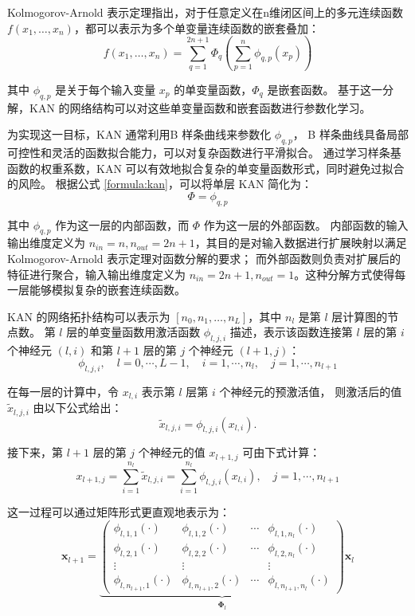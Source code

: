 Kolmogorov-Arnold 表示定理指出，对于任意定义在n维闭区间上的多元连续函数$f(x_1, \ldots, x_n)$，都可以表示为多个单变量连续函数的嵌套叠加：
\begin{equation}
    \label{formula:kan}
f(x_1, \ldots, x_n)=\sum_{q=1}^{2 n+1} \Phi_q(\sum_{p=1}^n \phi_{q, p}(x_p))
\end{equation}

其中 $\phi_{q, p}$ 是关于每个输入变量 $x_p$ 的单变量函数，$\Phi_q$ 是嵌套函数。
基于这一分解，KAN 的网络结构可以对这些单变量函数和嵌套函数进行参数化学习。

为实现这一目标，KAN 通常利用B 样条曲线来参数化 $\phi_{q, p}$，
B 样条曲线具备局部可控性和灵活的函数拟合能力，可以对复杂函数进行平滑拟合。
通过学习样条基函数的权重系数，KAN 可以有效地拟合复杂的单变量函数形式，同时避免过拟合的风险。
根据公式 \eqref{formula:kan}，可以将单层 KAN 简化为：
\begin{equation}
    \Phi = {\phi_{q,p}}
\end{equation}

其中 $\phi_{q,p}$ 作为这一层的内部函数，而 $\Phi$ 作为这一层的外部函数。
内部函数的输入输出维度定义为 $n_{in}=n, n_{out}=2n+1$，其目的是对输入数据进行扩展映射以满足 Kolmogorov-Arnold 表示定理对函数分解的要求；
而外部函数则负责对扩展后的特征进行聚合，输入输出维度定义为 $n_{in}=2n+1, n_{out}=1$。这种分解方式使得每一层能够模拟复杂的嵌套连续函数。

KAN 的网络拓扑结构可以表示为 $[n_0, n_1, …, n_L]$，其中 $n_l$ 是第 $l$ 层计算图的节点数。
第 $l$ 层的单变量函数用激活函数 $\phi_{l,j,i}$ 描述，表示该函数连接第 $l$ 层的第 $i$ 个神经元 $(l,i)$ 和第 $l+1$ 层的第 $j$ 个神经元 $(l+1,j)$：
\begin{equation}
    \phi_{l, j, i}, \quad l=0, \cdots, L-1, \quad i=1, \cdots, n_l, \quad j=1, \cdots, n_{l+1}
\end{equation}

在每一层的计算中，令 $x_{l,i}$ 表示第 $l$ 层第 $i$ 个神经元的预激活值，
则激活后的值 $\tilde{x}_{l,j,i}$ 由以下公式给出：
\begin{equation}
    \tilde{x}_{l,j,i} = \phi_{l,j,i}(x_{l,i}).
\end{equation}

接下来，第 $l+1$ 层的第 $j$ 个神经元的值 $x_{l+1,j}$ 可由下式计算：
\begin{equation}
    x_{l+1, j}=\sum_{i=1}^{n_l} \tilde{x}_{l, j, i}=\sum_{i=1}^{n_l} \phi_{l, j, i}\left(x_{l, i}\right), \quad j=1, \cdots, n_{l+1}
\end{equation}

这一过程可以通过矩阵形式更直观地表示为：
\begin{equation}
    \mathbf{x}_{l+1}=\underbrace{\left(\begin{array}{cccc}\phi_{l, 1,1}(\cdot) & \phi_{l, 1,2}(\cdot) & \cdots & \phi_{l, 1, n_l}(\cdot) \\ \phi_{l, 2,1}(\cdot) & \phi_{l, 2,2}(\cdot) & \cdots & \phi_{l, 2, n_l}(\cdot) \\ \vdots & \vdots & & \vdots \\ \phi_{l, n_{l+1}, 1}(\cdot) & \phi_{l, n_{l+1}, 2}(\cdot) & \cdots & \phi_{l, n_{l+1}, n_l}(\cdot)\end{array}\right)}_{\boldsymbol{\Phi}_l} \mathbf{x}_l
\end{equation}

